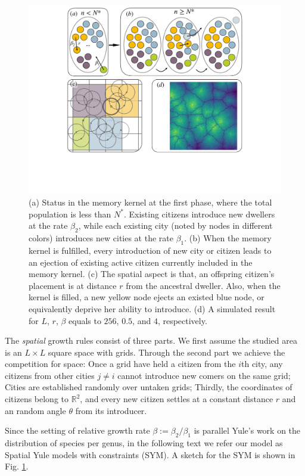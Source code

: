 \documentclass[reprint,unsortedaddress,amsmath,amssymb,aps,prl,showkeys]{revtex4-2}
\begin{document}
\begin{figure}
	\centering
	\includegraphics[width = 0.95\linewidth]{pics/sketchgood.pdf}
	\caption{(a) Status in the memory kernel at the first phase, where the total population is less than $N^*$. Existing citizens introduce new dwellers at the rate $\beta_2$, while each existing city (noted by nodes in different colors) introduces new cities at the rate $\beta_1$. (b) When the memory kernel is fulfilled, every introduction of new city or citizen leads to an ejection of existing active citizen currently included in the memory kernel. (c) The spatial aspect is that, an offspring citizen's placement is at distance $r$ from the ancestral dweller. Also, when the kernel is filled, a new yellow node ejects an existed blue node, or equivalently deprive her ability to introduce. (d) A simulated result for $L$, $r$, $\beta$ equals to $256$, $0.5$, and $4$, respectively.}
	\label{sketchpic}
\end{figure}

The \emph{spatial} growth rules consist of three parts. We first assume the studied area is an $L\times L$ square space with grids. Through the second part we achieve the competition for space: Once a grid have held a citizen from the $i$th city, any citizens from other cities $j\ne i$ cannot introduce new comers on the same grid; Cities are established randomly over untaken grids; Thirdly, the coordinates of citizens belong to $\mathbb{R}^2$, and every new citizen settles at a constant distance $r$ and an random angle $\theta$ from its introducer.

Since the setting of relative growth rate $\beta:= \beta_2/\beta_1$ is parallel Yule's work on the distribution of species per genus\cite{yule1925ii}, in the following text we refer our model as Spatial Yule models with constraints (SYM). A sketch for the SYM is shown in Fig. \ref{sketchpic}.
\end{document}
